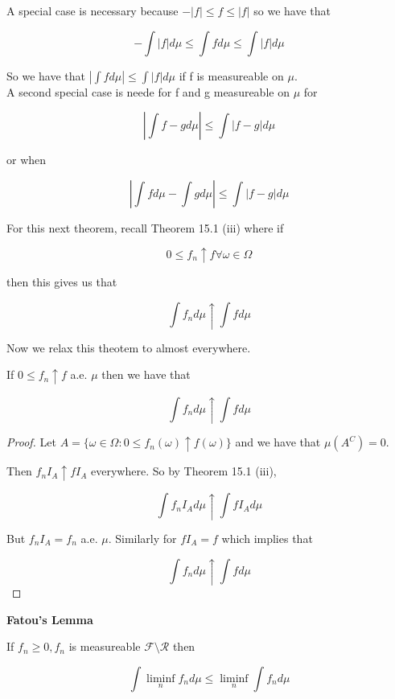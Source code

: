 \documentclass[11pt,fleqn]{book} %
\begin{document}
A special case is necessary because $-|f| \leq f \leq |f|$ so we have that 

		$$ -\int|f| d\mu \leq \int f d\mu \leq \int|f| d\mu$$


So we have that $| \int f d\mu | \leq \int |f| d\mu $ if f is measureable on $\mu$. \\


A second special case is neede for f and g measureable on $\mu$ for 

		$$| \int f - g d\mu | \leq \int |f - g| d\mu $$

or when

		$$| \int f d\mu - \int g d\mu | \leq \int |f - g| d\mu $$



For this next theorem, recall Theorem 15.1 (iii) where if

			$$0 \leq f_n \uparrow f  \forall \omega \in \Omega$$

	then this gives us that

			$$\int f_n d\mu \uparrow \int f d\mu $$

	Now we relax this theotem to almost everywhere. 

\begin{theorem}

If $0 \leq f_n \uparrow f$ a.e. $\mu$ then we have that 

		$$\int f_n d\mu \uparrow \int f d\mu$$

\end{theorem}

\begin{proof}
	Let $A = \{\omega \in \Omega: 0 \leq f_n(\omega) \uparrow f(\omega)\}$ and we have that $\mu(A^C) = 0$.

	Then $f_n I_A \uparrow f I_A $ everywhere. So by Theorem 15.1 (iii), 

			$$ \int f_n I_A d\mu \uparrow \int f I_A d\mu$$

	But $f_n I_A = f_n$ a.e. $\mu$. Similarly for $f I_A = f$ which implies that

			$$ \int f_n  d\mu \uparrow \int f d\mu$$ 
\end{proof}


\textbf{Fatou's Lemma}\\

\begin{theorem}
	If $f_n \geq 0, f_n$ is measureable $\mathcal{F}\setminus \mathcal{R}$ then 

			$$\int \liminf_{n} f_n d\mu \leq \liminf_n \int f_n d\mu $$ 
\end{theorem}
\end{document}
